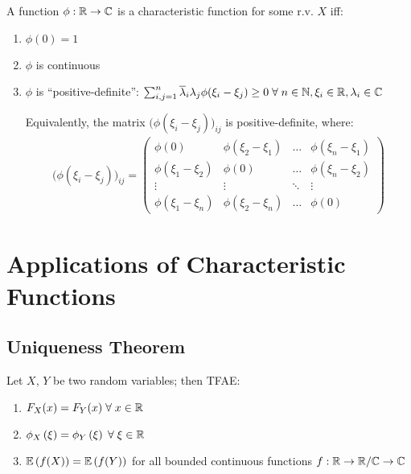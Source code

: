\documentclass[12pt]{extarticle}
\begin{document}
\begin{tcolorbox}[colback=white]
    \begin{theorem}
        A function $\phi:\mathbb{R}\to\mathbb{C}$ is a characteristic function for some r.v. $X$ iff: \begin{enumerate}
            \item $\phi(0)=1$
            \item $\phi$ is continuous
            \item $\phi$ is ``positive-definite'': $\sum_{i,j=1}^n\overline{\lambda}_i\lambda_j\phi(\xi_i-\xi_j)\geq0\;\forall\;n\in\mathbb{N},\xi_i\in\mathbb{R},\lambda_i\in\mathbb{C}$
    
            Equivalently, the matrix $\big(\phi(\xi_i-\xi_j)\big)_{ij}$ is positive-definite, where: \begin{align*}
                \big(\phi(\xi_i-\xi_j)\big)_{ij}=\begin{pmatrix}
                    \phi(0) & \phi(\xi_2-\xi_1) & \hdots & \phi(\xi_n-\xi_1) \\
                    \phi(\xi_1-\xi_2) & \phi(0) & \hdots & \phi(\xi_n-\xi_2) \\
                    \vdots & \vdots & \ddots & \vdots \\
                    \phi(\xi_1-\xi_n) & \phi(\xi_2-\xi_n) & \hdots & \phi(0)
                \end{pmatrix}
            \end{align*}
        \end{enumerate}
    \end{theorem}
\end{tcolorbox}


\pagebreak
\section{Applications of Characteristic Functions}
\subsection{Uniqueness Theorem}
\begin{tcolorbox}[colback=white]
    \begin{theorem}
        Let $X$, $Y$ be two random variables; then TFAE: \begin{enumerate}
            \item $F_X(x)=F_Y(x)\;\forall\;x\in\mathbb{R}$
            \item $\phi_{X}\left(\xi\right)=\phi_{Y}\left(\xi\right)\;\forall\;\xi\in\mathbb{R}$
            \item $\mathbb{E}\left(f(X)\right)=\mathbb{E}\left(f(Y)\right)$ for all bounded continuous functions $f:\mathbb{R}\to\mathbb{R}/\mathbb{C}\to\mathbb{C}$
        \end{enumerate}
    \end{theorem}
\end{tcolorbox}
\end{document}

